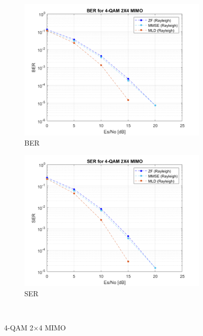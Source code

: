 \documentclass{article}
\begin{document}
\begin{figure}[H]
	\centering
	\begin{subfigure}{0.5\textwidth}
		\centerline{\includegraphics[width=1\textwidth]{e_Es_BER.png}}
		\caption{BER}
	\end{subfigure}%
	\begin{subfigure}{0.5\textwidth}
		\centerline{\includegraphics[width=1\textwidth]{e_Es_SER.png}}
		\caption{SER}
	\end{subfigure}\\%
	\caption{4-QAM 2$\times$4 MIMO}
\end{figure}
\end{document}
